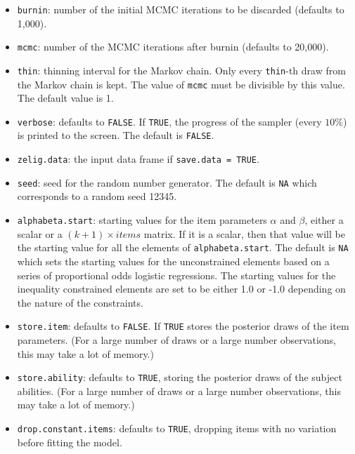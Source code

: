 \begin{itemize}
\item \texttt{burnin}: number of the initial MCMC iterations to be 
 discarded (defaults to 1,000). 

\item \texttt{mcmc}: number of the MCMC iterations after burnin
(defaults to 20,000).

\item \texttt{thin}: thinning interval for the Markov chain. Only every 
 \texttt{thin}-th draw from the Markov chain is kept. The value of 
\texttt{mcmc} must be divisible by this value. The default value is 1.

\item \texttt{verbose}: defaults to {\tt FALSE}. If \texttt{TRUE}, the progress 
 of the sampler (every $10\%$) is printed to the screen. The default 
is \texttt{FALSE}.

   \item {\tt zelig.data}: the input data frame if {\tt save.data = TRUE}.  

\item \texttt{seed}: seed for the random number generator. The default
is \texttt{NA} which corresponds to a random seed 12345.

\item \texttt{alphabeta.start}: starting values for the item parameters
$\alpha$ and $\beta$, either a scalar or a $(k+1) \times items$
matrix. If it is a scalar, then that value will be the starting value
for all the elements of \texttt{alphabeta.start}. The default is
\texttt{NA} which sets the starting values for the unconstrained
elements based on a series of proportional odds logistic
regressions. The starting values for the inequality constrained
elements are set to be either 1.0 or -1.0 depending on the nature of
the constraints.

\item \texttt{store.item}: defaults to {\tt FALSE}.  If {\tt TRUE} stores the
posterior draws of the item parameters.  (For a large number of draws or
a large number observations, this may take a lot of memory.)  

\item \texttt{store.ability}: defaults to {\tt TRUE}, storing the
posterior draws of the subject abilities.  (For a large number of draws or
a large number observations, this may take a lot of memory.) 

\item \texttt{drop.constant.items}: defaults to {\tt TRUE}, dropping
items with no variation before fitting the model.  
\end{itemize}

